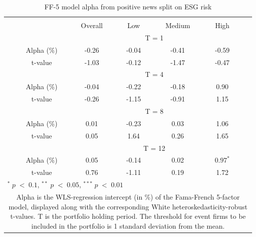\setlength{\tabcolsep}{15pt}
\begin{table}[H]
\small
\centering
\caption{FF-5 model alpha from positive news split on ESG risk} 
\begin{tabular}{ccccccc}
\hline \hline \\  
 &     & Overall  &    Low  &  Medium  &  High  &  \\ \cline{3-6} 
& & \multicolumn{4}{c}{ T = 1} & \\ \cline{2-6}
& Alpha (\%)  & -0.26 & -0.04  & -0.41  & -0.59 &  \\
& t-value & -1.03 & -0.12 & -1.47  & -0.47 & \\
& &  \multicolumn{4}{c}{ T = 4} & \\ \cline{2-6}
& Alpha (\%)  & -0.04 & -0.22  & -0.18  &  0.90 & \\
& t-value & -0.26 & -1.15 & -0.91  & 1.15 & \\
& &  \multicolumn{4}{c}{ T = 8} & \\ \cline{2-6}
& Alpha (\%)  & 0.01 & -0.23   & 0.03  & 1.06 &  \\
& t-value & 0.05 & 1.64  & 0.26 & 1.65 & \\
&  &  \multicolumn{4}{c}{ T = 12} & \\ \cline{2-6}
& Alpha (\%)  & 0.05 & -0.14  & 0.02  & $0.97^{*}$ &  \\
& t-value & 0.76 & -1.11  & 0.19 & 1.72 & \\
\hline \hline
 \multicolumn{7}{l}{ \footnotesize $^* \; p\; <\; 0.1$, $ ^{**} \; p\; <\; 0.05$, $ ^{***} \; p\; <\; 0.01$  } \\
 \multicolumn{7}{p{12cm}}{ \footnotesize Alpha is the WLS-regression intercept (in \%) of the Fama-French 5-factor model, displayed along with the corresponding White heteroskedasticity-robust t-values. T is the portfolio holding period. The threshold for event firms to be included in the portfolio is 1 standard deviation from the mean.}  \\ 
\end{tabular}
\label{tab: FF5_pos_ESG}
\end{table}
